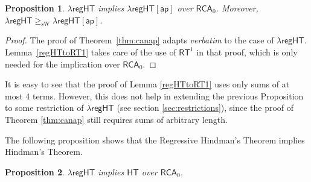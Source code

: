 \documentclass[a4paper,11pt]{article}
\newtheorem{proposition}{Proposition}
\newcommand\RCA{\mathsf{RCA}}
\newcommand\HT{\mathsf{HT}}
\newcommand\RT{\mathsf{RT}}
\newcommand\regHT{\mathsf{regHT}}
\newcommand\sW{\mathrm{sW}}
\newcommand\ap{\mathsf{ap}}
\begin{document}
\begin{proposition}\label{prop:regap}
$\lambda\regHT$ implies $\lambda\regHT[\ap]$ over $\RCA_0$. Moreover, $\lambda\regHT\geq_\sW \lambda\regHT[\ap]$.
\end{proposition}

\begin{proof}
The proof of Theorem~\ref{thm:canap} adapts {\em verbatim} to the case of $\lambda\regHT$. Lemma~\ref{regHTtoRT1} 
takes care of the use of $\RT^1$ in that proof, which is only needed for the implication over $\RCA_0$. 
\end{proof}

It is easy to see that the proof of Lemma \ref{regHTtoRT1} uses only sums of at most 4 terms.
However, this does not help in extending the previous Proposition to some restriction of $\lambda\regHT$ (see section \ref{sec:restrictions}), since the proof of Theorem \ref{thm:canap} still requires sums of arbitrary length.

\smallskip

The following proposition shows that the Regressive Hindman's Theorem implies Hindman's Theorem.

\begin{proposition}\label{prop:reghtht}
$\lambda\regHT$ implies $\HT$ over $\RCA_0$.
\end{proposition}
\end{document}
